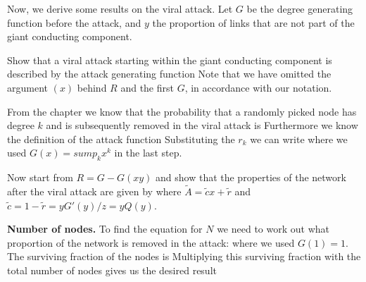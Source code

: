
Now, we derive some results on the viral attack. Let $G$ be the degree generating function before the attack, and $y$ the proportion of links that are not part of the giant conducting component. 

\subquestion 
Show that a viral attack starting within the giant conducting component is described by the attack generating function 
Note that we have omitted the argument $(x)$ behind $R$ and the first $G$, in accordance with our notation. 

\solution
From the chapter we know that the probability that a randomly picked node has degree $k$ and is subsequently removed in the viral attack is 
Furthermore we know the definition of the attack function
Substituting the $r_k$ we can write
where we used $G(x)=sum p_k x^k$ in the last step.

\subquestion
Now start from $R=G-G(xy)$ and show that the properties of the network after the viral attack are given by 
where $\tilde{A}=\tilde{c}x+\tilde{r}$ and $\tilde{c}=1-\tilde{r}=yG'(y)/z=yQ(y)$. 

\solution
{\bf Number of nodes.} To find the equation for $N$ we need to work out what proportion of the network is removed in the attack: 
where we used $G(1)=1$. The surviving fraction of the nodes is
Multiplying this surviving fraction with the total number of nodes gives us the desired result 

